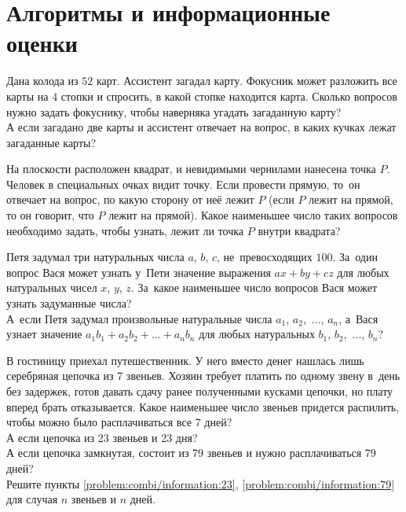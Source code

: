 

\section*{Алгоритмы и информационные оценки}


\begin{problems}

\item
\sbp
Дана колода из $52$ карт.
Ассистент загадал карту.
Фокусник может разложить все карты на $4$ стопки и спросить, в какой стопке
находится карта.
Сколько вопросов нужно задать фокуснику, чтобы наверняка угадать загаданную
карту?
\\
\sbp
А если загадано две карты и ассистент отвечает на вопрос, в каких кучках лежат
загаданные карты?

\item
На плоскости расположен квадрат, и невидимыми чернилами нанесена точка $P$.
Человек в специальных очках видит точку.
Если провести прямую, то~он отвечает на вопрос, по какую сторону от неё лежит
$P$ (если $P$ лежит на прямой, то он говорит, что $P$ лежит на прямой). 
Какое наименьшее число таких вопросов необходимо задать, чтобы узнать, лежит ли
точка $P$ внутри квадрата?

\item
\sbp
Петя задумал три натуральных числа $a$, $b$, $c$, не~превосходящих $100$.
За~один вопрос Вася может узнать у~Пети значение выражения $a x + b y + c z$
для любых натуральных чисел $x$, $y$, $z$.
За~какое наименьшее число вопросов Вася может узнать задуманные числа?
\\
\sbp
А~если Петя задумал произвольные натуральные числа
$a_1$, $a_2$,~$\ldots$, $a_n$, а~Вася узнает значение
$a_1 b_1 + a_2 b_2 + \ldots + a_n b_n$ для любых натуральных
$b_1$, $b_2$,~$\ldots$, $b_n$?

\item
\sbp
В гостиницу приехал путешественник.
У него вместо денег нашлась лишь серебряная цепочка из 7 звеньев.
Хозяин требует платить по одному звену в~день без задержек, готов давать сдачу
ранее полученными кусками цепочки, но плату вперед брать отказывается.
Какое наименьшее число звеньев придется распилить, чтобы можно было
расплачиваться все 7 дней?
\\
\sbp\label{problem:combi/information:23}%
А если цепочка из 23 звеньев и 23 дня?
\\
\sbp\label{problem:combi/information:79}%
А если цепочка замкнутая, состоит из 79 звеньев и нужно расплачиваться 79 дней?
\\
\sbp
Решите пункты
\ref{problem:combi/information:23}, \ref{problem:combi/information:79}
для случая $n$ звеньев и $n$ дней.


\end{problems}
